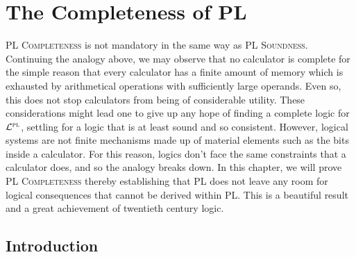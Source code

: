 ﻿%
\chapter{The Completeness of PL}
\label{ch.PL-completeness}

\textsc{PL Completeness} is not mandatory in the same way as \textsc{PL Soundness}.
Continuing the analogy above, we may observe that no calculator is complete for the simple reason that every calculator has a finite amount of memory which is exhausted by arithmetical operations with sufficiently large operands.
Even so, this does not stop calculators from being of considerable utility.
These considerations might lead one to give up any hope of finding a complete logic for $\mathcal{L}^{\textsc{pl}}$, settling for a logic that is at least sound and so consistent.
However, logical systems are not finite mechanisms made up of material elements such as the bits inside a calculator.
For this reason, logics don't face the same constraints that a calculator does, and so the analogy breaks down.
In this chapter, we will prove \textsc{PL Completeness} thereby establishing that PL does not leave any room for logical consequences that cannot be derived within PL.
This is a beautiful result and a great achievement of twentieth century logic.

\section{Introduction}
  \label{sec:Introduction}


